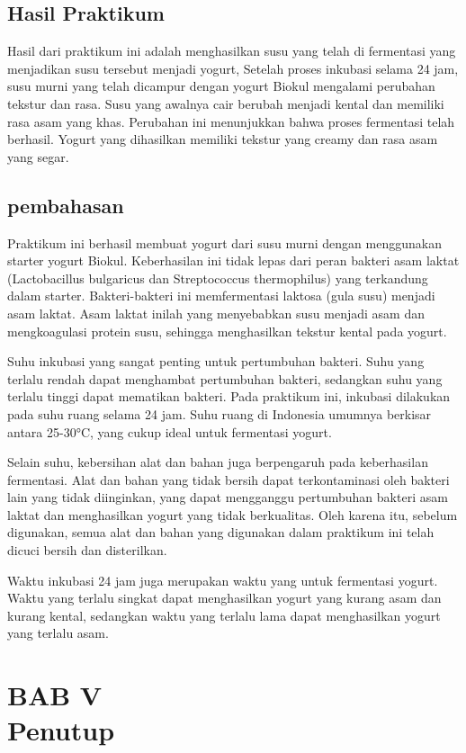 \documentclass[a4paper,12pt, left=3cm,right=2cm,bottom=2cm, bahasa]{article}
\begin{document}
\subsection{Hasil Praktikum}
Hasil dari praktikum ini adalah menghasilkan susu yang telah di fermentasi yang menjadikan susu tersebut menjadi yogurt, 
Setelah proses inkubasi selama 24 jam, susu murni yang telah dicampur dengan yogurt Biokul mengalami perubahan tekstur dan rasa. Susu yang awalnya cair berubah menjadi kental dan memiliki rasa asam yang khas. Perubahan ini menunjukkan bahwa proses fermentasi telah berhasil. Yogurt yang dihasilkan memiliki tekstur yang creamy dan rasa asam yang segar.
\subsection{pembahasan}
Praktikum ini berhasil membuat yogurt dari susu murni dengan menggunakan starter yogurt Biokul. Keberhasilan ini tidak lepas dari peran bakteri asam laktat (Lactobacillus bulgaricus dan Streptococcus thermophilus) yang terkandung dalam starter. Bakteri-bakteri ini memfermentasi laktosa (gula susu) menjadi asam laktat. Asam laktat inilah yang menyebabkan susu menjadi asam dan mengkoagulasi protein susu, sehingga menghasilkan tekstur kental pada yogurt.

Suhu inkubasi yang sangat penting untuk pertumbuhan bakteri. Suhu yang terlalu rendah dapat menghambat pertumbuhan bakteri, sedangkan suhu yang terlalu tinggi dapat mematikan bakteri. Pada praktikum ini, inkubasi dilakukan pada suhu ruang selama 24 jam. Suhu ruang di Indonesia umumnya berkisar antara 25-30°C, yang cukup ideal untuk fermentasi yogurt.

Selain suhu, kebersihan alat dan bahan juga berpengaruh pada keberhasilan fermentasi. Alat dan bahan yang tidak bersih dapat terkontaminasi oleh bakteri lain yang tidak diinginkan, yang dapat mengganggu pertumbuhan bakteri asam laktat dan menghasilkan yogurt yang tidak berkualitas. Oleh karena itu, sebelum digunakan, semua alat dan bahan yang digunakan dalam praktikum ini telah dicuci bersih dan disterilkan.

Waktu inkubasi 24 jam juga merupakan waktu yang untuk fermentasi yogurt. Waktu yang terlalu singkat dapat menghasilkan yogurt yang kurang asam dan kurang kental, sedangkan waktu yang terlalu lama dapat menghasilkan yogurt yang terlalu asam.
\pagebreak
\setcounter{subsection}{0}
\setcounter{section}{5}
\section*{BAB V \\ Penutup}
\end{document}
